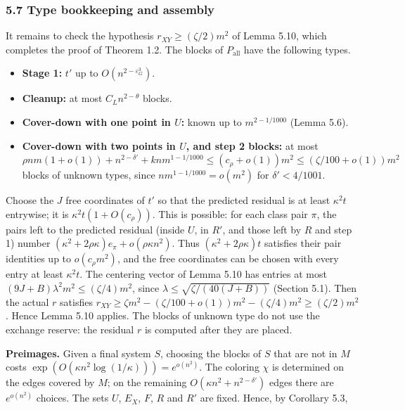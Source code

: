 \documentclass[english,11pt,a4paper]{article}
\providecommand{\tightlist}{\setlength{\itemsep}{0pt}\setlength{\parskip}{0pt}}
\begin{document}
\subsubsection{5.7 Type bookkeeping and assembly}\label{type-bookkeeping-and-assembly}

It remains to check the hypothesis \(r_{XY}\ge(\zeta/2)m^2\) of Lemma 5.10, which completes the proof of Theorem 1.2. The blocks of \(P_{\mathrm{all}}\) have the following types.

\begin{itemize}
\tightlist
\item
  \textbf{Stage 1:} \(t'\) up to \(O(n^{2-\varepsilon_G^3})\).
\item
  \textbf{Cleanup:} at most \(C_Ln^{2-\theta}\) blocks.
\item
  \textbf{Cover-down with one point in \(U\):} known up to \(m^{2-1/1000}\) (Lemma 5.6).
\item
  \textbf{Cover-down with two points in \(U\), and step 2 blocks:} at most \(\rho nm(1+o(1))+n^{2-\delta'}+knm^{1-1/1000}\le(c_\rho+o(1))m^2\le(\zeta/100+o(1))m^2\) blocks of unknown types, since \(nm^{1-1/1000}=o(m^2)\) for \(\delta'<4/1001\).
\end{itemize}

Choose the \(J\) free coordinates of \(t'\) so that the predicted residual is at least \(\kappa^2t\) entrywise; it is \(\kappa^2t(1+O(c_\rho))\). This is possible: for each class pair \(\pi\), the pairs left to the predicted residual (inside \(U\), in \(R'\), and those left by \(R\) and step 1) number \((\kappa^2+2\rho\kappa)e_\pi+o(\rho\kappa n^2)\). Thus \((\kappa^2+2\rho\kappa)t\) satisfies their pair identities up to \(o(c_\rho m^2)\), and the free coordinates can be chosen with every entry at least \(\kappa^2t\). The centering vector of Lemma 5.10 has entries at most \((9J+B)\lambda^2m^2\le(\zeta/4)m^2\), since \(\lambda\le\sqrt{\zeta/(40(J+B))}\) (Section 5.1). Then the actual \(r\) satisfies \(r_{XY}\ge\zeta m^2-(\zeta/100+o(1))m^2-(\zeta/4)m^2\ge(\zeta/2)m^2\). Hence Lemma 5.10 applies. The blocks of unknown type do not use the exchange reserve: the residual \(r\) is computed after they are placed.

\textbf{Preimages.} Given a final system \(S\), choosing the blocks of \(S\) that are not in \(M\) costs \(\exp(O(\kappa n^2\log(1/\kappa)))=e^{o(n^2)}\). The coloring \(\chi\) is determined on the edges covered by \(M\); on the remaining \(O(\kappa n^2+n^{2-\delta'})\) edges there are \(e^{o(n^2)}\) choices. The sets \(U\), \(E_X\), \(F\), \(R\) and \(R'\) are fixed. Hence, by Corollary 5.3,
\end{document}
